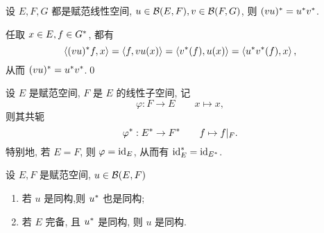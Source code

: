     \begin{Proposition}
        设 $ E, F, G $ 都是赋范线性空间, $ u\in\mathcal{B}(E, F), v\in\mathcal{B}(F, G) $, 则 $ (vu)^{*}=u^{*}v^{*} $.
    \end{Proposition}
    \begin{Proof}
        任取 $ x\in E, f\in G^{*} $, 都有
        \[
            \left\langle (vu)^{*}f, x \right\rangle=\left\langle f, vu(x) \right\rangle=\left\langle v^{*}(f), u(x) \right\rangle=\left\langle u^{*}v^{*}(f), x \right\rangle,
        \]
        从而 $ (vu)^{*}=u^{*}v^{*} $.\qed
    \end{Proof}

    \begin{Example}
        设 $ E $ 是赋范空间, $ F $ 是 $ E $ 的线性子空间, 记
        \[
            \varphi: F\to E\qquad x\mapsto x,
        \]
        则其共轭
        \[
            \varphi^{*}: E^{*}\to F^{*}\qquad f\mapsto f|_{F}.
        \]
        特别地, 若 $ E=F $, 则 $ \varphi=\mathrm{id}_{E} $, 从而有 $ \mathrm{id}_{E}^{*}=\mathrm{id}_{E^{*}} $.
    \end{Example}
    \begin{Theorem}
        设 $ E, F $ 是赋范空间, $ u\in\mathcal{B}(E, F) $
        \begin{enumerate}[(1)]
            \item 若 $ u $ 是同构,则 $ u^{*} $ 也是同构;
            \item 若 $ E $ 完备, 且 $ u^{*} $ 是同构, 则 $ u $ 是同构.
        \end{enumerate}
    \end{Theorem}
